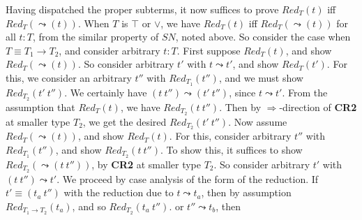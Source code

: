 \documentclass{article}
\newcommand{\red}[0]{\textit{Red}}
\newcommand{\sn}[0]{\textit{SN}}
\newcommand{\To}{\Rightarrow}
\begin{document}
Having dispatched the proper subterms, it now suffices to prove
$\red_{T}(t)$ iff $\red_{T}(\leadsto(t))$.  When $T$ is $\top$ or
$\vee$, we have $\red_T(t)$ iff $\red_T(\leadsto(t))$ for all $t:T$,
from the similar property of $\sn$, noted above.  So consider the case
when $T\equiv T_1\to T_2$, and consider arbitrary $t:T$.  First
suppose $\red_{T}(t)$, and show $\red_T(\leadsto(t))$.  So consider
arbitrary $t'$ with $t\leadsto t'$, and show $\red_T(t')$.  For this,
we consider an arbitrary $t''$ with $\red_{T_1}(t'')$, and we must
show $\red_{T_2}(t'\ t'')$.  We certainly have $(t\ t'')\leadsto (t'\
t'')$, since $t\leadsto t'$.  From the assumption that $\red_{T}(t)$,
we have $\red_{T_2}(t\ t'')$.  Then by $\To$-direction of \textbf{CR2}
at smaller type $T_2$, we get the desired $\red_{T_2}(t'\ t'')$.  Now
assume $\red_T(\leadsto(t))$, and show $\red_T(t)$.  For this,
consider arbitrary $t''$ with $\red_{T_1}(t'')$, and show
$\red_{T_2}(t\ t'')$.  To show this, it suffices to show
$\red_{T_2}(\leadsto(t\ t''))$, by \textbf{CR2} at smaller type $T_2$.
So consider arbitrary $t'$ with $(t\ t'')\leadsto t'$.  We proceed by
case analysis of the form of the reduction.  If $t' \equiv (t_a\ t'')$
with the reduction due to $t\leadsto t_a$, then by assumption $\red_{T_1\to T_2}(t_a)$,
and so $\red_{T_2}(t_a\ t'')$.   or $t'' \leadsto
t_b$, then 







\end{document}
